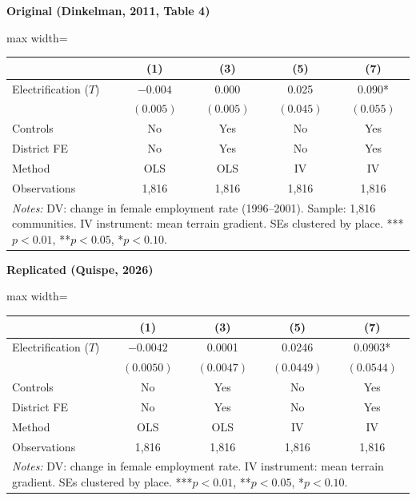 \documentclass[11pt,a4paper]{article}
\begin{document}
\vspace{0.3cm}
\noindent{}

\vspace{0.5cm}
\begin{minipage}[t]{0.48\textwidth}
\centering
\textbf{\large Original (Dinkelman, 2011, Table 4)}
\vspace{0.3cm}

\begin{adjustbox}{max width=\textwidth}
\begin{tabular}{lcccc}
\toprule
 & (1) & (3) & (5) & (7) \\
\midrule
Electrification ($T$) & $-0.004$ & $0.000$ & 0.025 & 0.090* \\
 & $(0.005)$ & $(0.005)$ & $(0.045)$ & $(0.055)$ \\[0.3em]
\midrule
Controls & No & Yes & No & Yes \\
District FE & No & Yes & No & Yes \\
Method & OLS & OLS & IV & IV \\
Observations & 1,816 & 1,816 & 1,816 & 1,816 \\
\bottomrule
\multicolumn{5}{p{0.95\textwidth}}{\footnotesize\textit{Notes:} DV: change in female employment rate (1996--2001). Sample: 1,816 communities. IV instrument: mean terrain gradient. SEs clustered by place. ***$p<0.01$, **$p<0.05$, *$p<0.10$.}
\end{tabular}
\end{adjustbox}
\end{minipage}%
\hfill
\begin{minipage}[t]{0.48\textwidth}
\centering
\textbf{\large Replicated (Quispe, 2026)}
\vspace{0.3cm}

\begin{adjustbox}{max width=\textwidth}
\begin{tabular}{lcccc}
\toprule
 & (1) & (3) & (5) & (7) \\
\midrule
Electrification ($T$) & $-0.0042$ & 0.0001 & 0.0246 & 0.0903* \\
 & $(0.0050)$ & $(0.0047)$ & $(0.0449)$ & $(0.0544)$ \\[0.3em]
\midrule
Controls & No & Yes & No & Yes \\
District FE & No & Yes & No & Yes \\
Method & OLS & OLS & IV & IV \\
Observations & 1,816 & 1,816 & 1,816 & 1,816 \\
\bottomrule
\multicolumn{5}{p{0.95\textwidth}}{\footnotesize\textit{Notes:} DV: change in female employment rate. IV instrument: mean terrain gradient. SEs clustered by place. ***$p<0.01$, **$p<0.05$, *$p<0.10$.}
\end{tabular}
\end{adjustbox}
\end{minipage}
\end{document}

